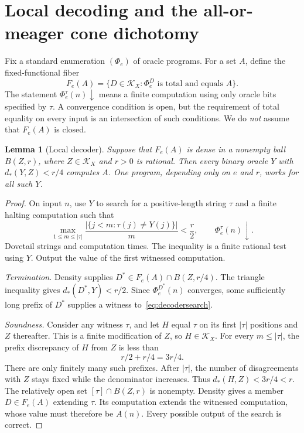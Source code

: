 \documentclass[11pt,a4paper]{article}
\newcommand{\dst}{d_{\!*}}
\newtheorem{lemma}[theorem]{Lemma}
\theoremstyle{definition}\newtheorem{definition}[theorem]{Definition}
\theoremstyle{remark}\newtheorem{remark}[theorem]{Remark}
\begin{document}
\section{Local decoding and the all-or-meager cone dichotomy}
\label{sec:decoder}
Fix a standard enumeration $(\Phi_e)$ of oracle programs. For a set $A$, define the fixed-functional fiber
\[
 F_e(A)=\{D\in\mathcal K_X:\Phi_e^D\text{ is total and equals }A\}.
\]
The statement $\Phi_e^\tau(n)\downarrow$ means a finite computation using only oracle bits specified by $\tau$. A convergence condition is open, but the requirement of total equality on every input is an intersection of such conditions. We do \emph{not} assume that $F_e(A)$ is closed.

\begin{lemma}[Local decoder]\label{lem:decoder}
Suppose that $F_e(A)$ is dense in a nonempty ball $B(Z,r)$, where $Z\in\mathcal K_X$ and $r>0$ is rational. Then every binary oracle $Y$ with $\dst(Y,Z)<r/4$ computes $A$. One program, depending only on $e$ and $r$, works for all such $Y$.
\end{lemma}
\begin{proof}
On input $n$, use $Y$ to search for a positive-length string $\tau$ and a finite halting computation such that
\begin{equation}
 \max_{1\le m\le|\tau|}
 \frac{|\{j<m:\tau(j)\ne Y(j)\}|}{m}<\frac r2,
 \qquad \Phi_e^\tau(n)\downarrow.
 \label{eq:decodersearch}
\end{equation}
Dovetail strings and computation times. The inequality is a finite rational test using $Y$. Output the value of the first witnessed computation.

\emph{Termination.} Density supplies $D^*\in F_e(A)\cap B(Z,r/4)$. The triangle inequality gives $\dst(D^*,Y)<r/2$. Since $\Phi_e^{D^*}(n)$ converges, some sufficiently long prefix of $D^*$ supplies a witness to~\eqref{eq:decodersearch}.

\emph{Soundness.} Consider any witness $\tau$, and let $H$ equal $\tau$ on its first $|\tau|$ positions and $Z$ thereafter. This is a finite modification of $Z$, so $H\in\mathcal K_X$. For every $m\le|\tau|$, the prefix discrepancy of $H$ from $Z$ is less than
\[
                    r/2+r/4=3r/4.
\]
There are only finitely many such prefixes. After $|\tau|$, the number of disagreements with $Z$ stays fixed while the denominator increases. Thus $\dst(H,Z)<3r/4<r$. The relatively open set $[\tau]\cap B(Z,r)$ is nonempty. Density gives a member $D\in F_e(A)$ extending $\tau$. Its computation extends the witnessed computation, whose value must therefore be $A(n)$. Every possible output of the search is correct.
\end{proof}
\end{document}
